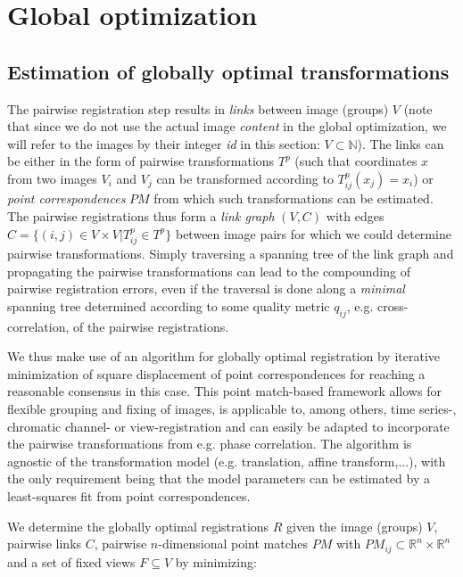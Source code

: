 \section{Global optimization}
\label{ssec:globalopt}

\subsection*{Estimation of globally optimal transformations}

The pairwise registration step results in \emph{links} between image (groups) $V$ (note that since we do not use the actual image \emph{content} in the global optimization, we will refer to the images by their integer \emph{id} in this section: $V \subset \mathbb{N}$). The links can be either in the form of pairwise transformations $T^{p}$  (such that coordinates $x$ from two images $V_i$ and $V_j$ can be transformed according to $T^p_{ij} (x_{j}) = x_i$) or \emph{point correspondences} $PM$ from which such transformations can be estimated.
The pairwise registrations thus form a \emph{link graph} $(V, C)$ with edges $C = \{(i,j) \in V \times V | T^p_{ij} \in T^p \}$ between image pairs for which we could determine pairwise transformations. Simply traversing a spanning tree of the link graph and propagating the pairwise transformations can lead to the compounding of pairwise registration errors, even if the traversal is done along a \emph{minimal} spanning tree determined according to some quality metric $q_{ij}$, e.g. cross-correlation, of the pairwise registrations.

We thus make use of an algorithm for globally optimal registration by iterative minimization of square displacement of point correspondences\cite{saalfeld2010rigid, saalfeld2012elastic} for reaching a reasonable consensus in this case. This point match-based framework allows for flexible grouping and fixing of images, is applicable to, among others, time series-, chromatic channel- or view-registration and can easily be adapted to incorporate the pairwise transformations from e.g. phase correlation. The algorithm is agnostic of the transformation model (e.g. translation, affine transform,...), with the only requirement being that the model parameters can be estimated by a least-squares fit from point correspondences.

We determine the globally optimal registrations $R$ given the image (groups) $V$, pairwise links $C$, pairwise $n$-dimensional point matches $PM$ with $PM_{ij} \subset \mathbb{R}^n \times  \mathbb{R}^n$ and a set of fixed views $F \subseteq V$ by minimizing:

